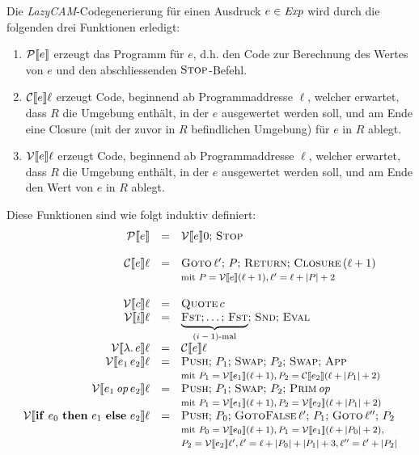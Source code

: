 \documentclass[12pt,fleqn,a4paper]{article}
\begin{document}
Die {\em LazyCAM}-Codegenerierung f\"ur einen Ausdruck $e\in{\text{\it Exp\/}}$ wird durch die folgenden drei Funktionen erledigt:
\begin{enumerate}
\item $\mathcal{P}\llbracket e \rrbracket$ erzeugt das Programm f\"ur $e$, d.h. den Code zur Berechnung des Wertes von $e$ und
  den abschliessenden $\textsc{Stop}$-Befehl.
\item $\mathcal{C}\llbracket e \rrbracket\ell$ erzeugt Code, beginnend ab Programmaddresse $\ell$, welcher erwartet, dass $R$ die
  Umgebung enth\"alt, in der $e$ ausgewertet werden soll, und am Ende eine Closure (mit der zuvor in $R$ befindlichen
  Umgebung) f\"ur $e$ in $R$ ablegt.
\item $\mathcal{V}\llbracket e \rrbracket\ell$ erzeugt Code, beginnend ab Programmaddresse $\ell$, welcher erwartet, dass $R$ die
  Umgebung enth\"alt, in der $e$ ausgewertet werden soll, und am Ende den Wert von $e$ in $R$ ablegt.
\end{enumerate}
Diese Funktionen sind wie folgt induktiv definiert:
\[\begin{array}{rcl}
  \mathcal{P}\llbracket e \rrbracket
  &=& \mathcal{V}\llbracket e \rrbracket0;\,\textsc{Stop} \\
  \\
  \mathcal{C}\llbracket e \rrbracket\ell
  &=& \textsc{Goto}\,\ell';\,P;\,\textsc{Return};\,\textsc{Closure}\,(\ell+1) \\
  && \footnotesize{\text{mit $P = \mathcal{V}\llbracket e \rrbracket(\ell+1), \ell' = \ell + |P| + 2$}} \\
  \\
  \mathcal{V}\llbracket c \rrbracket\ell
  &=& \textsc{Quote}\,c \\

  \mathcal{V}\llbracket \underline{i} \rrbracket\ell
  &=& \underbrace{\textsc{Fst};\ldots;\,\textsc{Fst}}_{\text{$(i-1)$-mal}};\,\textsc{Snd};\,\textsc{Eval} \\

  \mathcal{V}\llbracket \lambda .\,e \rrbracket\ell
  &=& \mathcal{C}\llbracket e \rrbracket\ell \\

  \mathcal{V}\llbracket e_1\,e_2 \rrbracket\ell
  &=& \textsc{Push};\,P_1;\,\textsc{Swap};\,P_2;\,\textsc{Swap};\,\textsc{App} \\
  && {\footnotesize \text{mit $P_1=\mathcal{V}\llbracket e_1 \rrbracket(\ell+1),P_2=\mathcal{C}\llbracket e_2 \rrbracket(\ell+|P_1|+2)$}} \\

  \mathcal{V}\llbracket e_1\,{\text{\it op\/}}\,e_2 \rrbracket\ell
  &=& \textsc{Push};\,P_1;\,\textsc{Swap};\,P_2;\,\textsc{Prim}\,{\text{\it op\/}} \\
  && {\footnotesize \text{mit $P_1=\mathcal{V}\llbracket e_1 \rrbracket(\ell+1),P_2=\mathcal{V}\llbracket e_2 \rrbracket(\ell+|P_1|+2)$}} \\

  \mathcal{V}\llbracket \mathbf{if}\ e_0\ \mathbf{then}\ e_1\ \mathbf{else}\ e_2 \rrbracket\ell
  &=& \textsc{Push};\,P_0;\,\textsc{GotoFalse}\,\ell';\,P_1;\,\textsc{Goto}\,\ell'';\,P_2 \\
  && {\footnotesize \text{mit $P_0=\mathcal{V}\llbracket e_0 \rrbracket(\ell+1),P_1=\mathcal{V}\llbracket e_1 \rrbracket(\ell+|P_0|+2),$}} \\
  && {\footnotesize \text{$P_2=\mathcal{V}\llbracket e_2 \rrbracket\ell',\ell'=\ell+|P_0|+|P_1|+3,\ell''=\ell'+|P_2|$}}
\end{array}\]
\end{document}
